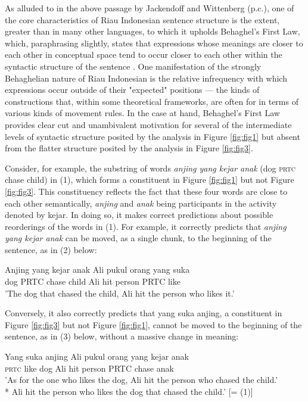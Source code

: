 \documentclass[output=paper,colorlinks,citecolor=brown
]{langscibook}
\begin{document}
As alluded to in the above passage by Jackendoff and Wittenberg (p.c.), one of the core characteristics of Riau Indonesian sentence structure is the extent, greater than in many other languages, to which it upholds Behaghel's First Law, which, paraphrasing slightly, states that expressions whose meanings are closer to each other in conceptual space tend to occur closer to each other within the syntactic structure of the sentence \citep{behaghel1932deutsche}.  One manifestation of the strongly Behaghelian nature of Riau Indonesian is the relative infrequency with which expressions occur outside of their "expected" positions — the kinds of constructions that, within some theoretical frameworks, are often for in terms of various kinds of movement rules.  In the case at hand, Behaghel's First Law provides clear cut and unambivalent motivation for several of the intermediate levels of syntactic structure posited by the analysis in Figure \ref{fig:fig1} but absent from the flatter structure posited by the analysis in Figure \ref{fig:fig3}.

Consider, for example, the substring of words \emph{anjing yang kejar anak} (dog \textsc{prtc} chase child) in (1), which forms a constituent in Figure \ref{fig:fig1} but not Figure \ref{fig:fig3}.  This constituency reflects the fact that these four words are close to each other semantically, \emph{anjing} and \emph{anak} being participants in the activity denoted by kejar.  In doing so, it makes correct predictions about possible reorderings of the words in (1).  For example, it correctly predicts that \emph{anjing yang kejar anak} can be moved, as a single chunk, to the beginning of the sentence, as in (2) below:  

\ea
\gll Anjing	yang	kejar	anak	Ali	pukul	orang	yang	suka\\
 dog	PRTC	chase	child	Ali	hit	person	PRTC	like	\\
\glt 'The dog that chased the child, Ali hit the person who likes it.'
\z

Conversely, it also correctly predicts that yang suka anjing, a constituent in Figure \ref{fig:fig3} but not Figure \ref{fig:fig1}, cannot be moved to the beginning of the sentence, as in (3) below, without a massive change in meaning:

\ea
\gll Yang	suka	anjing	Ali	pukul	orang	yang	kejar	anak\\
 \textsc{prtc}	like	dog	Ali	hit	person	PRTC	chase	anak\\
\glt 'As for the one who likes the dog, Ali hit the person who chased the child.' \\
*	Ali hit the person who likes the dog that chased the child.' [= (1)]
\z
\end{document}
